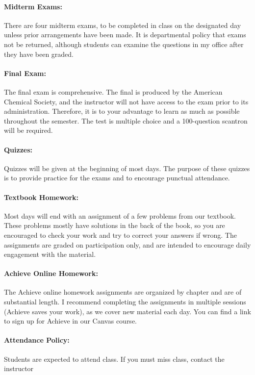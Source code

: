 \documentclass[12pt, letterpaper]{article}
\begin{document}
\paragraph{Midterm Exams:}
There are four midterm exams, to be completed in class on the designated day unless prior arrangements have been made. It is departmental policy that exams not be returned, although students can examine the questions in my office after they have been graded.

\paragraph{Final Exam:}
The final exam is comprehensive. The final is produced by the American Chemical Society, and the instructor will not have access to the exam prior to its administration. Therefore, it is to your advantage to learn as much as possible throughout the semester. The test is multiple choice and a 100-question scantron will be required.

\paragraph{Quizzes:}
Quizzes will be given at the beginning of most days. The purpose of these quizzes is to provide practice for the exams and to encourage punctual attendance.

\paragraph{Textbook Homework:}
Most days will end with an assignment of a few problems from our textbook. These problems mostly have solutions in the back of the book, so you are encouraged to check your work and try to correct your answers if wrong. The assignments are graded on participation only, and are intended to encourage daily engagement with the material.

\paragraph{Achieve Online Homework:}
The Achieve online homework assignments are organized by chapter and are of substantial length. I recommend completing the assignments in multiple sessions (Achieve saves your work), as we cover new material each day. You can find a link to sign up for Achieve in our Canvas course.

\paragraph{Attendance Policy:}
Students are expected to attend class. If you must miss class, contact the instructor
\end{document}
